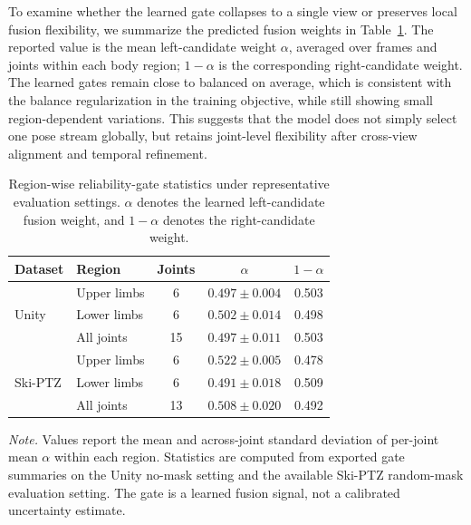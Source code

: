 \documentclass[sigconf,screen]{acmart}
\begin{document}
To examine whether the learned gate collapses to a single view or preserves local fusion flexibility, we summarize the predicted fusion weights in Table~\ref{tab:gate_region_summary}. The reported value is the mean left-candidate weight \(\alpha\), averaged over frames and joints within each body region; \(1-\alpha\) is the corresponding right-candidate weight. The learned gates remain close to balanced on average, which is consistent with the balance regularization in the training objective, while still showing small region-dependent variations. This suggests that the model does not simply select one pose stream globally, but retains joint-level flexibility after cross-view alignment and temporal refinement.

\begin{table}[t]
\centering
\caption{Region-wise reliability-gate statistics under representative evaluation settings. \(\alpha\) denotes the learned left-candidate fusion weight, and \(1-\alpha\) denotes the right-candidate weight.}
\label{tab:gate_region_summary}
\footnotesize
\setlength{\tabcolsep}{4.2pt}
\renewcommand{\arraystretch}{1.08}
\begin{tabular}{llccc}
\hline
Dataset & Region & Joints & \(\alpha\) & \(1-\alpha\) \\
\hline
\multirow{3}{*}{Unity}
& Upper limbs & 6 & \(0.497 \pm 0.004\) & 0.503 \\
& Lower limbs & 6 & \(0.502 \pm 0.014\) & 0.498 \\
& All joints & 15 & \(0.497 \pm 0.011\) & 0.503 \\
\hline
\multirow{3}{*}{Ski-PTZ}
& Upper limbs & 6 & \(0.522 \pm 0.005\) & 0.478 \\
& Lower limbs & 6 & \(0.491 \pm 0.018\) & 0.509 \\
& All joints & 13 & \(0.508 \pm 0.020\) & 0.492 \\
\hline
\end{tabular}
\vspace{0.4em}
\begin{minipage}{0.95\linewidth}
\footnotesize
\textit{Note.} Values report the mean and across-joint standard deviation of per-joint mean \(\alpha\) within each region. Statistics are computed from exported gate summaries on the Unity no-mask setting and the available Ski-PTZ random-mask evaluation setting. The gate is a learned fusion signal, not a calibrated uncertainty estimate.
\end{minipage}
\end{table}
\end{document}
